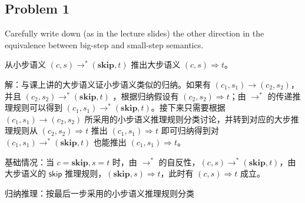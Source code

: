 \documentclass[UTF8]{ctexart}
\begin{document}
    \subsection*{Problem 1}

    \begin{framed}
    Carefully write down (as in the lecture slides)  the other direction in the equivalence between big-step and small-step semantics.

    从小步语义 $(c, s) \to^{\ast} (\mathbf{skip}, t)$ 推出大步语义 $(c, s) \Rightarrow t$。
    \end{framed}

    解：与课上讲的大步语义证小步语义类似的归纳。如果有 $(c_1, s_1) \to (c_2, s_2)$，并且 $(c_2, s_2) \to^{\ast} (\mathbf{skip}, t)$ ，根据归纳假设有 $(c_2, s_2) \Rightarrow t$；由 $\to^{\ast}$ 的传递推理规则可以得到 $(c_1, s_1) \to^{\ast} (\mathbf{skip}, t)$。接下来只需要根据 $(c_1, s_1) \to (c_2, s_2)$ 所采用的小步语义推理规则分类讨论，并转到对应的大步推理规则从 $(c_2, s_2) \Rightarrow t$ 推出 $(c_1, s_1) \Rightarrow t$ 即可归纳得到对 $(c_1, s_1) \to^{\ast} (\mathbf{skip}, t)$ 也能推出 $(c_1, s_1) \Rightarrow t$。
    
    基础情况：当 $c=\mathbf{skip}, s=t$ 时，由 $\to^{\ast}$ 的自反性，$(c, s)\to^{\ast}(\mathbf{skip}, t)$，由大步语义的 $\mathsf{skip}$ 推理规则，$(\mathbf{skip}, s) \Rightarrow t$，此时有 $(c, s) \Rightarrow t$ 成立。

    归纳推理：按最后一步采用的小步语义推理规则分类
\end{document}
